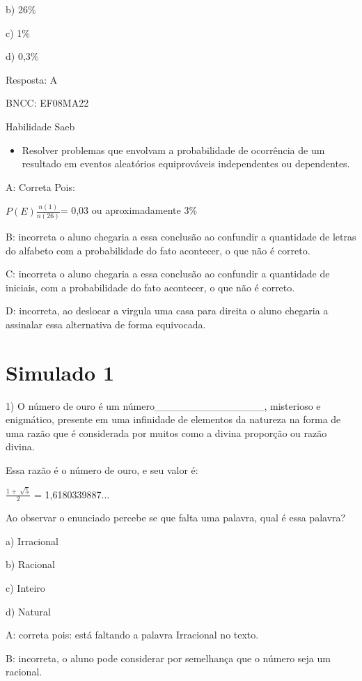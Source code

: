 b) 26\%

c) 1\%

d) 0,3\%

Resposta: A

BNCC: EF08MA22

Habilidade Saeb

\begin{itemize}
\tightlist
\item
  Resolver problemas que envolvam a probabilidade de ocorrência de um
  resultado em eventos aleatórios equiprováveis independentes ou
  dependentes.
\end{itemize}

A: Correta Pois:

\(P(E)\frac{n(1)}{n(26)}\)= 0,03 ou aproximadamente 3\%

B: incorreta o aluno chegaria a essa conclusão ao confundir a quantidade
de letras do alfabeto com a probabilidade do fato acontecer, o que não é
correto.

C: incorreta o aluno chegaria a essa conclusão ao confundir a quantidade
de iniciais, com a probabilidade do fato acontecer, o que não é correto.

D: incorreta, ao deslocar a virgula uma casa para direita o aluno
chegaria a assinalar essa alternativa de forma equivocada.

\hypertarget{simulado-1}{%
\section{Simulado 1}\label{simulado-1}}

1) O número de ouro é um número\_\_\_\_\_\_\_\_\_\_\_\_\_\_\_,
misterioso e enigmático, presente em uma infinidade de elementos da
natureza na forma de uma razão que é considerada por muitos como a
divina proporção ou razão divina.

Essa razão é o número de ouro, e seu valor é:

\(\frac{1 + \ \sqrt{5}}{2}\) = 1,6180339887...

Ao observar o enunciado percebe se que falta uma palavra, qual é essa
palavra?

a) Irracional

b) Racional

c) Inteiro

d) Natural

A: correta pois: está faltando a palavra Irracional no texto.

B: incorreta, o aluno pode considerar por semelhança que o número seja
um racional.

